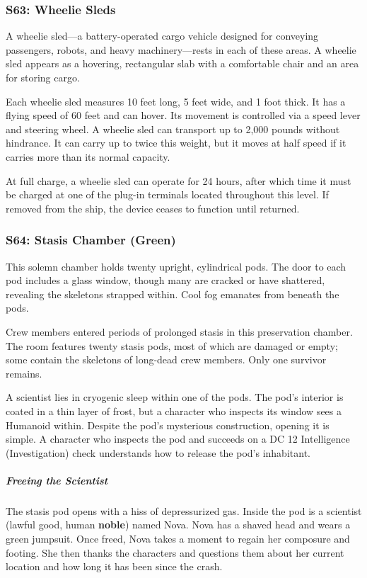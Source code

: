 \documentclass[10pt,a4paper,twoside,bg=print,twocolumn,openany,nodeprecatedcode]{dndbook}
\begin{document}
\subsubsection{S63: Wheelie Sleds}
A wheelie sled—a battery-operated cargo vehicle designed for conveying passengers, robots, and heavy machinery—rests in each of these areas. A wheelie sled appears as a hovering, rectangular slab with a comfortable chair and an area for storing cargo.

Each wheelie sled measures 10 feet long, 5 feet wide, and 1 foot thick. It has a flying speed of 60 feet and can hover. Its movement is controlled via a speed lever and steering wheel. A wheelie sled can transport up to 2,000 pounds without hindrance. It can carry up to twice this weight, but it moves at half speed if it carries more than its normal capacity.

At full charge, a wheelie sled can operate for 24 hours, after which time it must be charged at one of the plug-in terminals located throughout this level. If removed from the ship, the device ceases to function until returned.

\subsubsection{S64: Stasis Chamber (Green)}
\begin{DndReadAloud}{}
This solemn chamber holds twenty upright, cylindrical pods. The door to each pod includes a glass window, though many are cracked or have shattered, revealing the skeletons strapped within. Cool fog emanates from beneath the pods.

\end{DndReadAloud}

Crew members entered periods of prolonged stasis in this preservation chamber. The room features twenty stasis pods, most of which are damaged or empty; some contain the skeletons of long-dead crew members. Only one survivor remains.

A scientist lies in cryogenic sleep within one of the pods. The pod's interior is coated in a thin layer of frost, but a character who inspects its window sees a Humanoid within. Despite the pod's mysterious construction, opening it is simple. A character who inspects the pod and succeeds on a DC 12 Intelligence (Investigation) check understands how to release the pod's inhabitant.

\subparagraph{Freeing the Scientist}
The stasis pod opens with a hiss of depressurized gas. Inside the pod is a scientist (lawful good, human \textbf{noble}) named Nova. Nova has a shaved head and wears a green jumpsuit. Once freed, Nova takes a moment to regain her composure and footing. She then thanks the characters and questions them about her current location and how long it has been since the crash.
\end{document}

